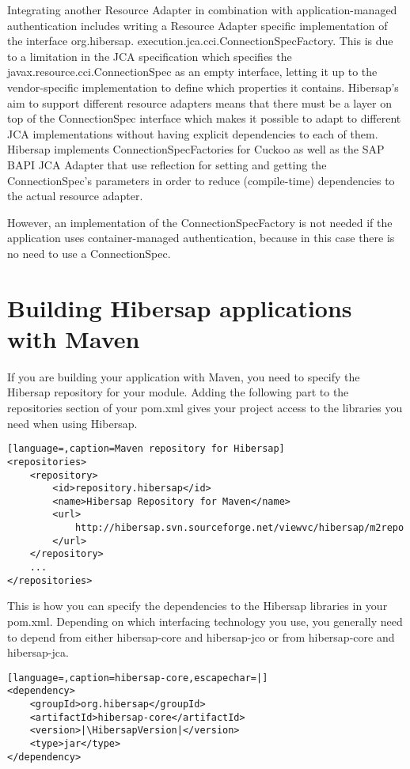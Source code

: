 Integrating another Resource Adapter in combination with application-managed authentication includes writing a Resource Adapter specific implementation of the interface org.hibersap. execution.jca.cci.ConnectionSpecFactory. This is due to a limitation in the JCA specification which specifies the javax.resource.cci.ConnectionSpec as an empty interface, letting it up to the vendor-specific implementation to define which properties it contains. Hibersap's aim to support different resource adapters means that there must be a layer on top of the ConnectionSpec interface which makes it possible to adapt to different JCA implementations without having explicit dependencies to each of them. Hibersap implements ConnectionSpecFactories for Cuckoo as well as the SAP BAPI JCA Adapter that use reflection for setting and getting the ConnectionSpec's parameters in order to reduce (compile-time) dependencies to the actual resource adapter.

However, an implementation of the ConnectionSpecFactory is not needed if the application uses container-managed authentication, because in this case there is no need to use a ConnectionSpec.

\section{Building Hibersap applications with Maven}
\label{sec:Maven}

If you are building your application with Maven, you need to specify the Hibersap repository for your module.
Adding the following part to the repositories section of your pom.xml gives your project access to 
the libraries you need when using Hibersap.

\begin{lstlisting}[language=,caption=Maven repository for Hibersap]
<repositories>
    <repository>
        <id>repository.hibersap</id>
        <name>Hibersap Repository for Maven</name>
        <url>
            http://hibersap.svn.sourceforge.net/viewvc/hibersap/m2repo
        </url>
    </repository>
    ... 
</repositories>
\end{lstlisting}

This is how you can specify the dependencies to the Hibersap libraries in your pom.xml.
Depending on which interfacing technology you use, you generally need to depend from either
hibersap-core and hibersap-jco or from hibersap-core and hibersap-jca.

\begin{lstlisting}[language=,caption=hibersap-core,escapechar=|]
<dependency>
    <groupId>org.hibersap</groupId>
    <artifactId>hibersap-core</artifactId>
    <version>|\HibersapVersion|</version>
    <type>jar</type>
</dependency>
\end{lstlisting}

